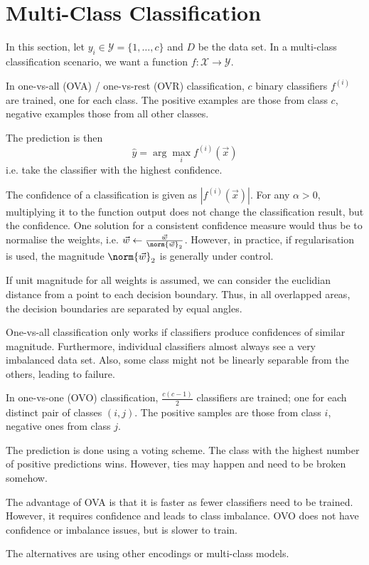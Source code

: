 \section{Multi-Class Classification}
In this section, let $y_i \in \mathcal{Y} = \{1, \dotsc, c\}$
and $D$ be the data set.
In a multi-class classification scenario,
we want a function $f : \mathcal{X} \to \mathcal{Y}$.

In one-vs-all (OVA) / one-vs-rest (OVR) classification,
$c$ binary classifiers $f^{(i)}$ are trained,
one for each class.
The positive examples are those from class $c$,
negative examples those from all other classes.

The prediction is then
\begin{equation*}
    \hat{y} = \arg\max_i f^{(i)}(\vec{x})
\end{equation*}
i.e. take the classifier with the highest confidence.

The confidence of a classification is given as
$|f^{(i)}(\vec{x})|$.
For any $\alpha > 0$, multiplying it to the function output
does not change the classification result, but the confidence.
One solution for a consistent confidence measure would thus be
to normalise the weights,
i.e. $\vec{w} \gets \frac{\vec{w}}{\norm{\vec{w}}_2}$.
However, in practice, if regularisation is used,
the magnitude $\norm{\vec{w}}_2$ is generally under control.

If unit magnitude for all weights is assumed,
we can consider the euclidian distance from a point
to each decision boundary.
Thus, in all overlapped areas, the decision boundaries
are separated by equal angles.

One-vs-all classification only works if classifiers produce
confidences of similar magnitude.
Furthermore, individual classifiers almost always see
a very imbalanced data set.
Also, some class might not be linearly separable from the
others, leading to failure.

In one-vs-one (OVO) classification,
$\frac{c (c - 1)}{2}$ classifiers are trained;
one for each distinct pair of classes $(i, j)$.
The positive samples are those from class $i$,
negative ones from class $j$.

The prediction is done using a voting scheme.
The class with the highest number of positive predictions wins.
However, ties may happen and need to be broken somehow.

The advantage of OVA is that it is faster as fewer classifiers
need to be trained. However, it requires confidence and leads
to class imbalance.
OVO does not have confidence or imbalance issues,
but is slower to train.

The alternatives are using other encodings or
multi-class models.
